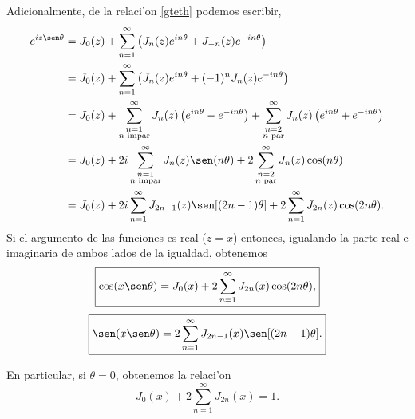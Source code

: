 Adicionalmente, de la relaci'on \eqref{gteth} podemos escribir,
\begin{align}
e^{iz\sen\theta} &= J_0(z)+\sum_{n=1}^\infty\left(J_n(z) e^{in\theta}+J_{-n}(z) e^{-in\theta}\right) \\
&=  J_0(z)+\sum_{n=1}^\infty\left(J_n(z) e^{in\theta}+(-1)^nJ_{n}(z) e^{-in\theta}\right) \\
&=  J_0(z)+\sum_{\substack{n=1 \\ n \text{ impar}}}^\infty J_n(z)\left(e^{in\theta}-e^{-in\theta}\right)+\sum_{\substack{n=2 \\ n \text{ par}}}^\infty J_n(z)\left(e^{in\theta}+e^{-in\theta}\right) \\
&=  J_0(z)+2i\sum_{\substack{n=1 \\ n \text{ impar}}}^\infty J_n(z)\sen(n\theta) +2\sum_{\substack{n=2 \\ n \text{ par}}}^\infty J_n(z)\cos(n\theta) \\
&=  J_0(z)+2i\sum_{n=1}^\infty J_{2n-1}(z)\sen[(2n-1)\theta] +2\sum_{n=1}^\infty J_{2n}(z)\cos(2n\theta).
\end{align}
Si el argumento de las funciones es real ($z=x$) entonces, igualando la parte real e imaginaria de ambos lados de la igualdad, obtenemos
\begin{equation}
\boxed{\cos(x\sen\theta)=J_0(x)+2\sum_{n=1}^\infty J_{2n}(x)\cos(2n\theta),}
\end{equation}
\begin{equation}
\boxed{\sen(x\sen\theta)=2\sum_{n=1}^\infty J_{2n-1}(x)\sen[(2n-1)\theta].}
\end{equation}

En particular, si $\theta=0$, obtenemos la relaci'on
\begin{equation}
J_0(x)+2\sum_{n=1}^\infty J_{2n}(x)=1.
\end{equation}


